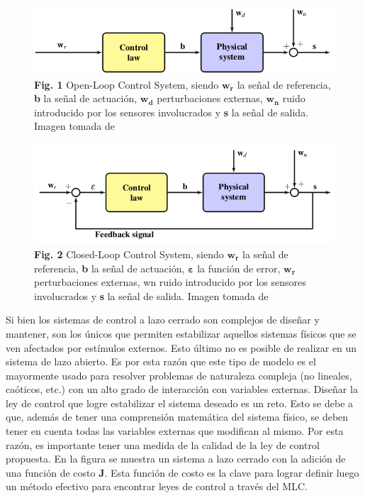 \documentclass[a4paper,10pt]{article}
\begin{document}
        \begin{figure}[!Hhtb]
            \centering
            \includegraphics[width=12cm,origin=c]{Imagenes/open_loop.png}
            \caption{\textbf{Fig. 1} Open-Loop Control System, siendo $\mathbf{w_r}$ la señal de referencia, \textbf{b} la señal de
            actuación, $\mathbf{w_d}$ perturbaciones externas, $\mathbf{w_n}$ ruido introducido por los sensores involucrados y
            \textbf{s} la señal de salida. Imagen tomada de \cite{Duriez2016}} \label{fig001}
        \end{figure}

        \begin{figure}[!Hhtb]
            \centering
            \includegraphics[width=12cm,origin=c]{Imagenes/closed_loop.png}
            \caption{\textbf{Fig. 2} Closed-Loop Control System, siendo $\mathbf{w_r}$ la señal de referencia, \textbf{b} la señal
            de actuación, $\bm{\varepsilon}$ la función de error, $\mathbf{w_r}$ perturbaciones externas, wn ruido introducido por los
            sensores involucrados y \textbf{s} la señal de salida. Imagen tomada de \cite{Duriez2016}} \label{fig002}
        \end{figure}

        Si bien los sistemas de control a lazo cerrado son complejos de diseñar y mantener, son los únicos que permiten estabilizar
        aquellos sistemas físicos que se ven afectados por estímulos externos. Esto último no es posible de realizar en un sistema de
        lazo abierto. Es por esta razón que este tipo de modelo es el mayormente usado para resolver problemas de naturaleza compleja
        (no lineales, caóticos, etc.) con un alto grado de interacción con variables externas.
        \indent Diseñar la ley de control que logre estabilizar el sistema deseado es un reto. Esto se debe a que, además de tener una
        comprensión matemática del sistema físico, se deben tener en cuenta todas las variables externas que modifican al mismo. Por esta
        razón, es importante tener una medida de la calidad de la ley de control propuesta. En la figura \label{fig003} se muestra un
        sistema a lazo cerrado con la adición de una función de costo \textbf{J}. Esta función de costo es la clave para lograr definir
        luego un método efectivo para encontrar leyes de control a través del MLC.
\end{document}
